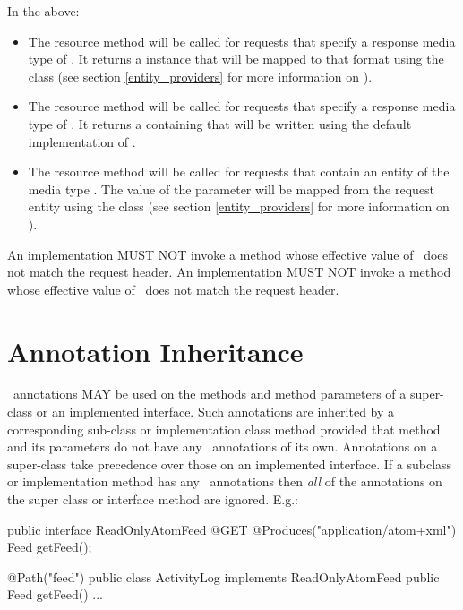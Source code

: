 In the above:
\begin{itemize}
\item The  resource method will be called for  requests that specify a response media type of . It returns a  instance that will be mapped to that format using the  class (see section \ref{entity_providers} for more information on \MsgWrite).
\item The  resource method will be called for  requests that specify a response media type of . It returns a  containing  that will be written using the default implementation of .
\item The  resource method will be called for  requests that contain an entity of the media type . The value of the  parameter will be mapped from the request entity using the  class (see section \ref{entity_providers} for more information on \MsgRead).
\end{itemize}

An implementation MUST NOT invoke a method whose effective value of \Produces\ does not match the request  header. An implementation MUST NOT invoke a method whose effective value of \Consumes\ does not match the request  header.

\section{Annotation Inheritance}
\label{annotationinheritance}

\jaxrs\ annotations MAY be used on the methods and method parameters of a super-class or an implemented interface. Such annotations are inherited by a corresponding sub-class or implementation class method provided that method and its parameters do not have any \jaxrs\ annotations of its own. Annotations on a super-class take precedence over those on an implemented interface. If a subclass or implementation method has any \jaxrs\ annotations then {\em all} of the annotations on the super class or interface method are ignored. E.g.:

\begin{listing}{1}
public interface ReadOnlyAtomFeed {
  @GET @Produces("application/atom+xml")
  Feed getFeed();
}

@Path("feed")
public class ActivityLog implements ReadOnlyAtomFeed {
  public Feed getFeed() {...}
}
\end{listing}

